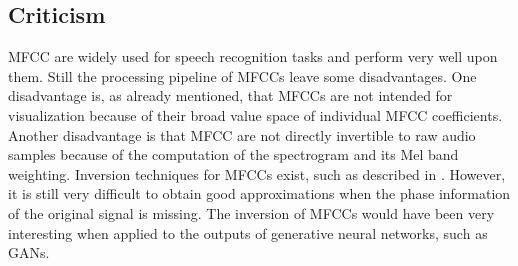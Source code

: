 
\subsection{Criticism}
MFCC are widely used for speech recognition tasks and perform very well upon them. 
Still the processing pipeline of MFCCs leave some disadvantages.
One disadvantage is, as already mentioned, that MFCCs are not intended for visualization because of their broad value space of individual MFCC coefficients.
Another disadvantage is that MFCC are not directly invertible to raw audio samples because of the computation of the spectrogram and its Mel band weighting.
Inversion techniques for MFCCs exist, such as described in \cite{Boucheron2008}.
However, it is still very difficult to obtain good approximations when the phase information of the original signal is missing.
The inversion of MFCCs would have been very interesting when applied to the outputs of generative neural networks, such as GANs.